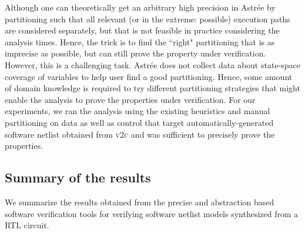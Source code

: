 Although one can theoretically get an arbitrary high precision in Astr{\'e}e by 
partitioning such that all relevant (or in the extreme: possible) execution 
paths are considered separately, but that is not feasible in practice considering 
the analysis times. Hence, the trick is to find the ``right" partitioning that 
is as imprecise as possible, but can still prove the property under verification.  
However, this is a challenging task.  Astr{\'e}e does not collect data about 
state-space coverage of variables to help user find a good partitioning.  Hence, 
some amount of domain knowledge is required to try different partitioning 
strategies that might enable the analysis to prove the properties under verification. 
For our experiments, we ran the analysis using the existing heuristics and manual partitioning on data as well 
as control that target automatically-generated software netlist obtained from \textsc{v2c} and 
was sufficient to precisely prove the properties. 







\subsection{Summary of the results} 
%
We summarize the results obtained from the precise and abstraction based 
software verification tools for verifying software netlist models synthesized
from a RTL circuit.  


